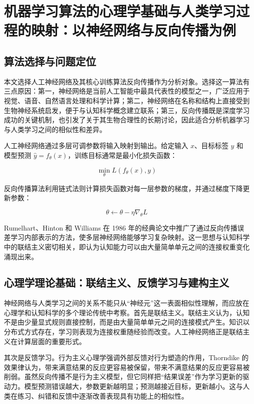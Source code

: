 \documentclass[UTF8,zihao=-4,a4paper]{ctexart}
\begin{document}
\newpage

\section{机器学习算法的心理学基础与人类学习过程的映射：以神经网络与反向传播为例}

\subsection{算法选择与问题定位}

本文选择人工神经网络及其核心训练算法反向传播作为分析对象。选择这一算法有三点原因：第一，神经网络是当前人工智能中最具代表性的模型之一，广泛应用于视觉、语音、自然语言处理和科学计算；第二，神经网络在名称和结构上直接受到生物神经系统启发，便于与认知科学概念建立联系；第三，反向传播既是深度学习成功的关键机制，也引发了关于其生物合理性的长期讨论，因此适合分析机器学习与人类学习之间的相似性和差异。

人工神经网络通过多层可调参数将输入映射到输出。给定输入 $x$、目标标签 $y$ 和模型预测 $\hat{y}=f_\theta(x)$，训练目标通常是最小化损失函数：

$$
\min_\theta L(f_\theta(x),y)
$$

反向传播算法利用链式法则计算损失函数对每一层参数的梯度，并通过梯度下降更新参数：

$$
\theta \leftarrow \theta - \eta \nabla_\theta L
$$

Rumelhart、Hinton 和 Williams 在 1986 年的经典论文中推广了通过反向传播误差学习内部表示的方法，使多层神经网络能够学习复杂映射\cite{rumelhart1986backprop}。这一思想与认知科学中的联结主义密切相关，即认为认知能力可以由大量简单单元之间的连接权重变化涌现出来。

\subsection{心理学理论基础：联结主义、反馈学习与建构主义}

神经网络与人类学习之间的关系不能只从“神经元”这一表面相似性理解，而应放在心理学和认知科学的多个理论传统中考察。首先是联结主义。联结主义认为，认知不是由少量显式规则直接控制，而是由大量简单单元之间的连接模式产生。知识以分布式方式存在，学习则表现为连接权重随经验而改变。人工神经网络正是联结主义在计算层面的重要形式。

其次是反馈学习。行为主义心理学强调外部反馈对行为塑造的作用，Thorndike 的效果律认为，带来满意结果的反应更容易被保留，带来不满意结果的反应更容易被削弱。虽然反向传播不是行为主义模型，但它同样把“结果误差”作为学习更新的驱动力。模型预测错误越大，参数更新越明显；预测越接近目标，更新越小。这与人类在练习、纠错和反馈中逐渐改善表现具有功能上的相似性。
\end{document}
